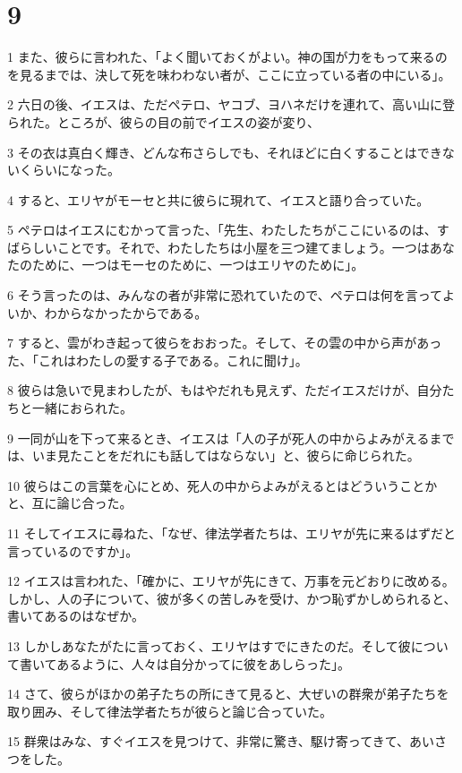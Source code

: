 \chapter{9}

\par 1 また、彼らに言われた、「よく聞いておくがよい。神の国が力をもって来るのを見るまでは、決して死を味わわない者が、ここに立っている者の中にいる」。
\par 2 六日の後、イエスは、ただペテロ、ヤコブ、ヨハネだけを連れて、高い山に登られた。ところが、彼らの目の前でイエスの姿が変り、
\par 3 その衣は真白く輝き、どんな布さらしでも、それほどに白くすることはできないくらいになった。
\par 4 すると、エリヤがモーセと共に彼らに現れて、イエスと語り合っていた。
\par 5 ペテロはイエスにむかって言った、「先生、わたしたちがここにいるのは、すばらしいことです。それで、わたしたちは小屋を三つ建てましょう。一つはあなたのために、一つはモーセのために、一つはエリヤのために」。
\par 6 そう言ったのは、みんなの者が非常に恐れていたので、ペテロは何を言ってよいか、わからなかったからである。
\par 7 すると、雲がわき起って彼らをおおった。そして、その雲の中から声があった、「これはわたしの愛する子である。これに聞け」。
\par 8 彼らは急いで見まわしたが、もはやだれも見えず、ただイエスだけが、自分たちと一緒におられた。
\par 9 一同が山を下って来るとき、イエスは「人の子が死人の中からよみがえるまでは、いま見たことをだれにも話してはならない」と、彼らに命じられた。
\par 10 彼らはこの言葉を心にとめ、死人の中からよみがえるとはどういうことかと、互に論じ合った。
\par 11 そしてイエスに尋ねた、「なぜ、律法学者たちは、エリヤが先に来るはずだと言っているのですか」。
\par 12 イエスは言われた、「確かに、エリヤが先にきて、万事を元どおりに改める。しかし、人の子について、彼が多くの苦しみを受け、かつ恥ずかしめられると、書いてあるのはなぜか。
\par 13 しかしあなたがたに言っておく、エリヤはすでにきたのだ。そして彼について書いてあるように、人々は自分かってに彼をあしらった」。
\par 14 さて、彼らがほかの弟子たちの所にきて見ると、大ぜいの群衆が弟子たちを取り囲み、そして律法学者たちが彼らと論じ合っていた。
\par 15 群衆はみな、すぐイエスを見つけて、非常に驚き、駆け寄ってきて、あいさつをした。
